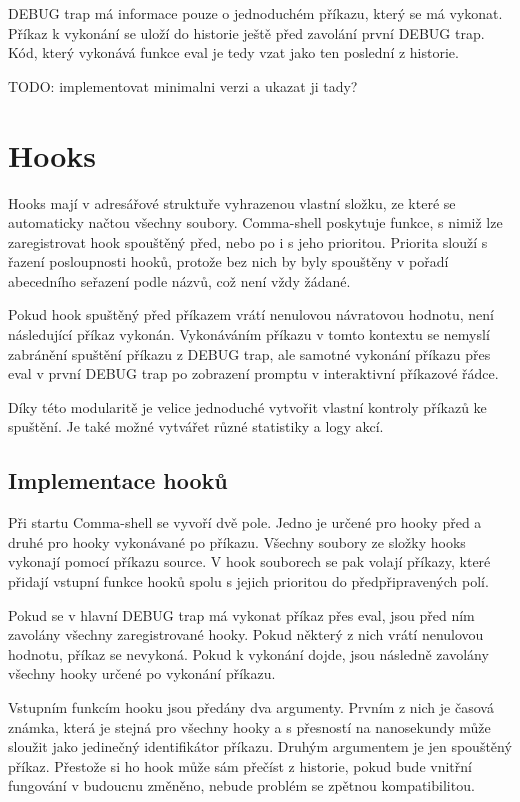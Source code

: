 \documentclass[thesis=M,czech]{FITthesis}[2012/06/26]
\begin{document}
DEBUG trap má informace pouze o jednoduchém příkazu, který se má vykonat. Příkaz k vykonání se uloží do historie ještě před zavolání první DEBUG trap. Kód, který vykonává funkce eval je tedy vzat jako ten poslední z historie.

TODO: implementovat minimalni verzi a ukazat ji tady?


%
%
%
%
%
\section{Hooks}

Hooks mají v adresářové struktuře vyhrazenou vlastní složku, ze které se automaticky načtou všechny soubory. Comma-shell poskytuje funkce, s nimiž lze zaregistrovat hook spouštěný před, nebo po i s jeho prioritou. Priorita slouží s řazení posloupnosti hooků, protože bez nich by byly spouštěny v pořadí abecedního seřazení podle názvů, což není vždy žádané.

Pokud hook spuštěný před příkazem vrátí nenulovou návratovou hodnotu, není následující příkaz vykonán. Vykonáváním příkazu v tomto kontextu se nemyslí zabránění spuštění příkazu z DEBUG trap, ale samotné vykonání příkazu přes eval v první DEBUG trap po zobrazení promptu v interaktivní příkazové řádce.

Díky této modularitě je velice jednoduché vytvořit vlastní kontroly příkazů ke spuštění. Je také možné vytvářet různé statistiky a logy akcí.


\subsection{Implementace hooků}

Při startu Comma-shell se vyvoří dvě pole. Jedno je určené pro hooky před a druhé pro hooky vykonávané po příkazu. Všechny soubory ze složky hooks vykonají pomocí příkazu source. V hook souborech se pak volají příkazy, které přidají vstupní funkce hooků spolu s jejich prioritou do předpřipravených polí.

Pokud se v hlavní DEBUG trap má vykonat příkaz přes eval, jsou před ním zavolány všechny zaregistrované hooky. Pokud některý z nich vrátí nenulovou hodnotu, příkaz se nevykoná. Pokud k vykonání dojde, jsou následně zavolány všechny hooky určené po vykonání příkazu.

Vstupním funkcím hooku jsou předány dva argumenty. Prvním z nich je časová známka, která je stejná pro všechny hooky a s přesností na nanosekundy může sloužit jako jedinečný identifikátor příkazu. Druhým argumentem je jen spouštěný příkaz. Přestože si ho hook může sám přečíst z historie, pokud bude vnitřní fungování v budoucnu změněno, nebude problém se zpětnou kompatibilitou.
\end{document}
